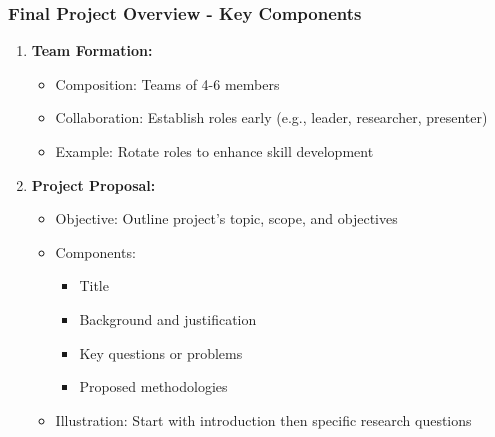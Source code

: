 \documentclass{beamer}
\begin{document}
\begin{frame}[fragile]
    \frametitle{Final Project Overview - Key Components}
    \begin{enumerate}
        \item \textbf{Team Formation:}
            \begin{itemize}
                \item Composition: Teams of 4-6 members
                \item Collaboration: Establish roles early (e.g., leader, researcher, presenter)
                \item Example: Rotate roles to enhance skill development
            \end{itemize}
        
        \item \textbf{Project Proposal:}
            \begin{itemize}
                \item Objective: Outline project's topic, scope, and objectives
                \item Components:
                    \begin{itemize}
                        \item Title
                        \item Background and justification
                        \item Key questions or problems
                        \item Proposed methodologies
                    \end{itemize}
                \item Illustration: Start with introduction then specific research questions
            \end{itemize}
    \end{enumerate}
\end{frame}
\end{document}
